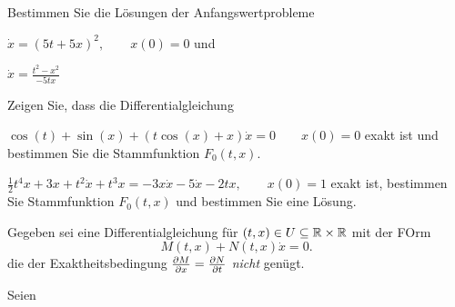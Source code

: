\begin{Problem}
Bestimmen Sie die Lösungen der Anfangswertprobleme
\begin{parts}
	\item $\dot{x}=(5t+5x)^2,\qquad x(0)=0$ und
	\item $\dot{x}=\frac{t^2-x^2}{-5tx}$
\end{parts}
\end{Problem}

\begin{Problem}
	Zeigen Sie, dass die Differentialgleichung
	\begin{parts}
	\item $\cos(t)+\sin(x)+(t\cos(x)+x)\dot{x}=0\qquad x(0)=0$ exakt ist und bestimmen Sie die Stammfunktion $F_0(t,x)$.
	\item $\frac{1}{2}t^4 x+3x+t^2\dot{x}+t^3x=-3x\dot{x}-5\dot{x}-2tx,\qquad x(0)=1$ exakt ist, bestimmen Sie Stammfunktion $F_0(t, x)$ und bestimmen Sie eine Lösung.
	\end{parts}
\end{Problem}

\begin{Problem}
	Gegeben sei eine Differentialgleichung für $(t,x)\in U\subseteq \mathbb{R} \times \mathbb{R}$ mit der FOrm
	\[
		M(t, x)+N(t, x)\dot{x}=0
	.\] 
	die der Exaktheitsbedingung $\pdv{M}{x}=\pdv{N}{t}$ \emph{nicht} genügt.
	\begin{parts}
	\item Seien
	\end{parts}
\end{Problem}

